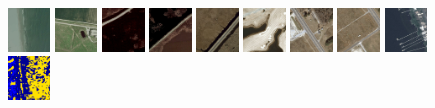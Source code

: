 \documentclass{acm_proc_article-sp}
\begin{document}
\begin{figure}
 \centering
 \includegraphics[width=0.1\textwidth]{fig/gmaps/71}
 \includegraphics[width=0.1\textwidth]{fig/gmaps/720}
 \includegraphics[width=0.1\textwidth]{fig/gmaps/978}
 \includegraphics[width=0.1\textwidth]{fig/gmaps/1307}
 \includegraphics[width=0.1\textwidth]{fig/gmaps/5474}
 \includegraphics[width=0.1\textwidth]{fig/gmaps/8436}
 \includegraphics[width=0.1\textwidth]{fig/gmaps/12338}
 \includegraphics[width=0.1\textwidth]{fig/gmaps/12396}
 \includegraphics[width=0.1\textwidth]{fig/gmaps/14811}\\
  \includegraphics[width=0.1\textwidth]{fig/gmaps/71g}

\end{figure}
\end{document}
